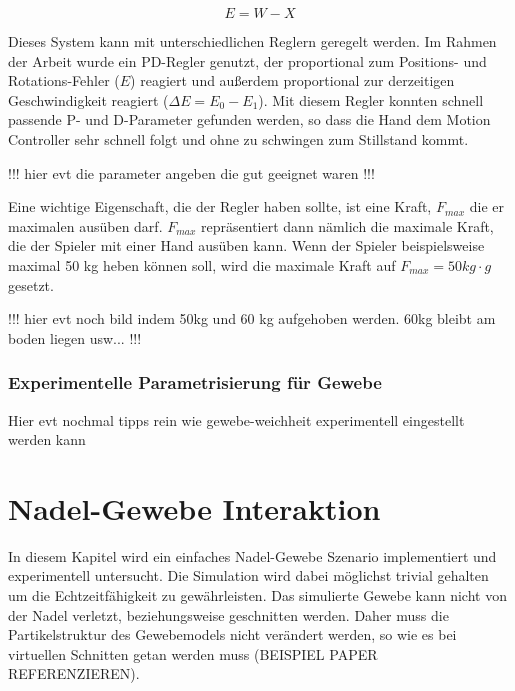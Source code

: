 \begin{equation}
E = W - X
\label{form_error}
\end{equation}

Dieses System kann mit unterschiedlichen Reglern geregelt werden. Im Rahmen der Arbeit wurde ein PD-Regler genutzt, der proportional zum Positions- und Rotations-Fehler ($E$) reagiert und außerdem proportional zur derzeitigen Geschwindigkeit reagiert ($\Delta E = E_0 - E_1$). Mit diesem Regler konnten schnell passende P- und D-Parameter gefunden werden, so dass die Hand dem Motion Controller sehr schnell folgt und ohne zu schwingen zum Stillstand kommt.

!!! hier evt die parameter angeben die gut geeignet waren !!!

Eine wichtige Eigenschaft, die der Regler haben sollte, ist eine Kraft, $F_{max}$ die er maximalen ausüben darf. $F_{max}$ repräsentiert dann nämlich die maximale Kraft, die der Spieler mit einer Hand ausüben kann. Wenn der Spieler beispielsweise maximal 50 kg heben können soll, wird die maximale Kraft auf $F_{max} = 50kg \cdot g$ gesetzt.

!!! hier evt noch bild indem 50kg und 60 kg aufgehoben werden. 60kg bleibt am boden liegen usw... !!!

\subsubsection{Experimentelle Parametrisierung für Gewebe}

Hier evt nochmal tipps rein wie gewebe-weichheit experimentell eingestellt werden kann

\section{Nadel-Gewebe Interaktion}
\label{sec_needle}


In diesem Kapitel wird ein einfaches Nadel-Gewebe Szenario implementiert und experimentell untersucht. Die Simulation wird dabei möglichst trivial gehalten um die Echtzeitfähigkeit zu gewährleisten. Das simulierte Gewebe kann nicht von der Nadel verletzt, beziehungsweise geschnitten werden. Daher muss die Partikelstruktur des Gewebemodels nicht verändert werden, so wie es bei virtuellen Schnitten getan werden muss (BEISPIEL PAPER REFERENZIEREN).

